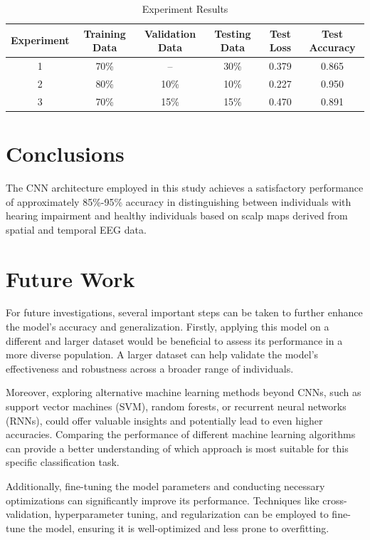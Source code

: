 \documentclass{article}
\begin{document}
\begin{table}[ht]
  \centering
  \caption{Experiment Results}
  \label{tab:experiment}
  \setlength{\tabcolsep}{6pt} %
  \begin{tabular}{|c|c|c|c|c|c|}
    \hline
    \textbf{Experiment} & \textbf{Training Data} & \textbf{Validation Data} & \textbf{Testing Data} & \textbf{Test Loss} & \textbf{Test Accuracy} \\
    \hline
    1 & 70\% & -- & 30\% & 0.379 & 0.865 \\
    \hline
    2 & 80\% & 10\% & 10\% & 0.227 & 0.950 \\
    \hline
    3 & 70\% & 15\% & 15\% & 0.470 & 0.891 \\
    \hline
  \end{tabular}
\end{table}



\section{Conclusions}
The CNN architecture employed in this study achieves a satisfactory performance of approximately 85\%-95\% accuracy in distinguishing between individuals with hearing impairment and healthy individuals based on scalp maps derived from spatial and temporal EEG data.

\section{Future Work}
For future investigations, several important steps can be taken to further enhance the model's accuracy and generalization. Firstly, applying this model on a different and larger dataset would be beneficial to assess its performance in a more diverse population. A larger dataset can help validate the model's effectiveness and robustness across a broader range of individuals.

Moreover, exploring alternative machine learning methods beyond CNNs, such as support vector machines (SVM), random forests, or recurrent neural networks (RNNs), could offer valuable insights and potentially lead to even higher accuracies. Comparing the performance of different machine learning algorithms can provide a better understanding of which approach is most suitable for this specific classification task.

Additionally, fine-tuning the model parameters and conducting necessary optimizations can significantly improve its performance. Techniques like cross-validation, hyperparameter tuning, and regularization can be employed to fine-tune the model, ensuring it is well-optimized and less prone to overfitting.
\end{document}
